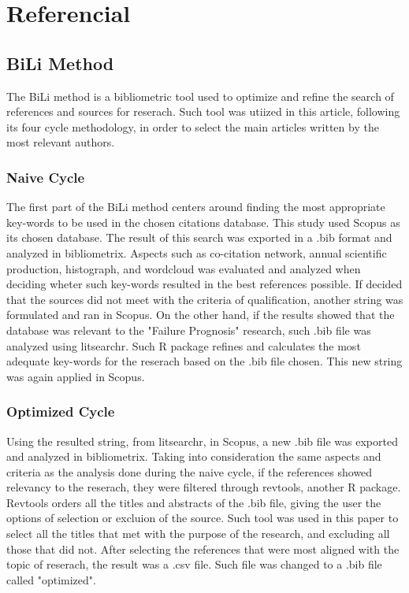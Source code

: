 \section{Referencial}

\subsection{BiLi Method}
The BiLi method is a bibliometric tool used to optimize and refine the search of references and sources for reserach. Such tool was utiized in this article, following its four cycle methodology, in order to select the main articles written by the most relevant authors.

\subsubsection{Naive Cycle}
The first part of the BiLi method centers around finding the most appropriate key-words to be used in the chosen citations database. This study used Scopus as its chosen database.
The result of this search was exported in a .bib format and analyzed in bibliometrix. Aspects such as co-citation network, annual scientific production,  histograph, and wordcloud was evaluated and analyzed when deciding wheter such key-words resulted in the best references possible.
If decided that the sources did not meet with the criteria of qualification, another string was formulated and ran in Scopus.
On the other hand, if the results showed that the database was relevant to the "Failure Prognosis" research, such .bib file was analyzed using litsearchr.
Such R package refines and calculates the most adequate key-words for the reserach based on the .bib file chosen. This new string was again applied in Scopus.

\subsubsection{Optimized Cycle}
Using the resulted string, from litsearchr, in Scopus, a new .bib file was exported and analyzed in bibliometrix. Taking into consideration the same aspects and criteria as the analysis done during the naive cycle, if the references showed relevancy to the reserach, they were filtered through revtools, another R package.
Revtools orders all the titles and abstracts of the .bib file, giving the user the options of selection or excluion of the source. Such tool was used in this paper to select all the titles that met with the purpose of the research, and excluding all those that did not.
After selecting the references that were most aligned with the topic of reserach, the result was a .csv file. Such file was changed to a .bib file called "optimized".

